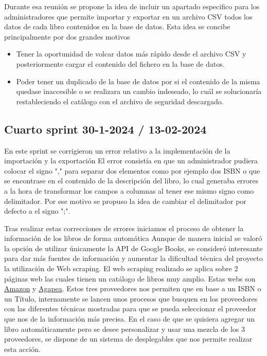 Durante esa reunión se propone la idea de incluir un apartado especifico para los administradores que permite importar y exportar en un archivo CSV todos los datos de cada libro contenidos en la base de datos. 
Esta idea se concibe principalmente por dos grandes motivos
\begin{itemize}
    \item Tener la oportunidad de volcar datos más rápido desde el archivo CSV y posteriormente cargar el contenido del fichero en la base de datos.
    \item Poder tener un duplicado de la base de datos por si el contenido de la misma quedase inaccesible o se realizara un cambio indeseado, lo cuál se solucionaría restableciendo el catálogo con el archivo de seguridad descargado.



\end{itemize}


\subsection{Cuarto sprint 30-1-2024 / 13-02-2024}
En este sprint se corrigieron un error relativo a la implementación de la importación y la exportación
El error consistía en que un administrador pudiera colocar el signo "," para separar dos elementos como por ejemplo dos ISBN o que se encontrase en el contenido de la descripción del libro, lo cual generaba errores a la hora de transformar los campos a columnas al tener ese mismo signo como delimitador. Por ese motivo se propuso la idea de cambiar el delimitador por defecto a el signo ";".

Tras realizar estas correcciones de errores iniciamos el proceso de obtener la información  de los libros de forma automática Aunque de manera inicial se valoró la opción de utilizar únicamente la API de Google Books,  se consideró interesante para  dar más fuentes de información y aumentar la dificultad técnica del proyecto la utilización de Web scraping. 
El  web scraping realizado se aplica sobre 2 páginas web las cuales tienen un catálogo de libros muy amplio. Estas webs son \href{https://www.amazon.es/}{Amazon} y \href{https://www.agapea.com/}{Agapea}. Estos tres proveedores nos permiten que en base a un ISBN o un Título, internamente se lancen unos procesos que busquen en los proveedores con las diferentes técnicas mostradas para que se pueda seleccionar el proveedor que nos de la información más precisa. 
En el caso de que se quisiera agregar un libro automáticamente pero se desee personalizar y usar una mezcla de los 3 proveedores, se dispone de un sistema de desplegables que nos permite realizar esta acción.

